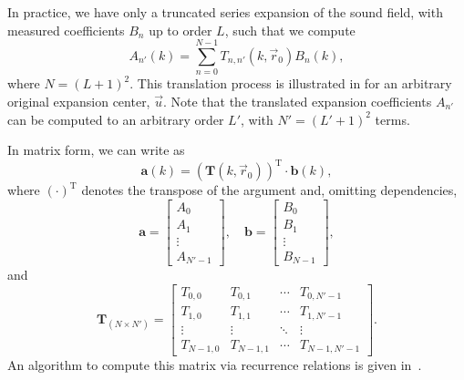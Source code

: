 In practice, we have only a truncated series expansion of the sound field, with measured coefficients $B_n$ up to order $L$, such that we compute
\begin{equation}\label{eq:02_Acoustical_Theory:Translated_Expansion_Coefficients}
A_{n'}(k) = \sum_{n = 0}^{N-1} T_{n,n'}(k, \vec{r}_0) B_n(k),
\end{equation}
where $N = (L + 1)^2$.
This translation process is illustrated in  for an arbitrary original expansion center, $\vec{u}$.
Note that the translated expansion coefficients $A_{n'}$ can be computed to an arbitrary order $L'$, with $N' = (L' + 1)^2$ terms.

In matrix form, we can write  as
\begin{equation}\label{eq:02_Acoustical_Theory:Translated_Expansion_Coefficients_Matrix}
\mathbf{a}(k) = \left( \mathbf{T}(k, \vec{r}_0) \right)^\text{T} \cdot \mathbf{b}(k),
\end{equation}
where $(\cdot)^\text{T}$ denotes the transpose of the argument and, omitting dependencies,
\begin{equation}\label{eq:02_Acoustical_Theory:Expansion_Coefficients_Vectors}
\mathbf{a} = 
    \left[ \begin{array}{c}
    A_0\\
    A_1\\
    \vdots\\
    A_{N'-1}
    \end{array} \right]
,\quad
\mathbf{b} = 
    \left[ \begin{array}{c}
    B_0\\
    B_1\\
    \vdots\\
    B_{N-1}
    \end{array} \right],
\end{equation}
and
\begin{equation}\label{eq:02_Acoustical_Theory:Translation_Matrix}
\mathbf{T}_{(N \times N')} = 
    \left[ \begin{array}{cccc}
    T_{0,0} & T_{0,1} & \cdots & T_{0,N'-1}\\
    T_{1,0} & T_{1,1} & \cdots & T_{1,N'-1}\\
    \vdots & \vdots & \ddots & \vdots\\
    T_{N-1,0} & T_{N-1,1} & \cdots & T_{N-1,N'-1}
    \end{array} \right].
\end{equation}
An algorithm to compute this matrix via recurrence relations is given in~.